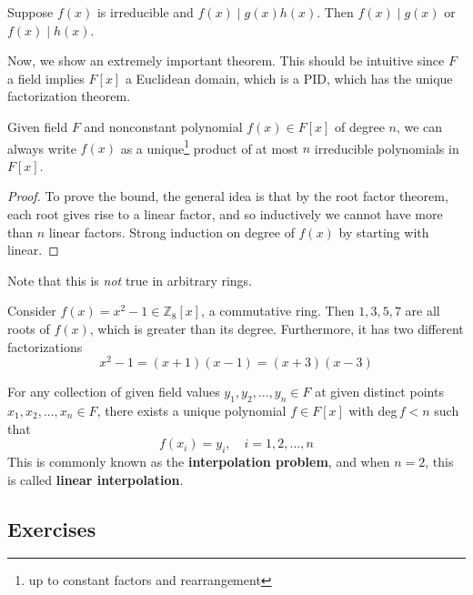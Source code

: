   \begin{lemma}
    Suppose $f(x)$ is irreducible and $f(x) \mid g(x) h(x)$. Then $f(x) \mid g(x)$ or $f(x) \mid h(x)$. 
  \end{lemma}

  Now, we show an extremely important theorem. This should be intuitive since $F$ a field implies $F[x]$ a Euclidean domain, which is a PID, which has the unique factorization theorem. 

  \begin{theorem}
    Given field $F$ and nonconstant polynomial $f(x) \in F[x]$ of degree $n$, we can always write $f(x)$ as a unique\footnote{up to constant factors and rearrangement} product of at most $n$ irreducible polynomials in $F[x]$. 
  \end{theorem}
  \begin{proof}
    To prove the bound, the general idea is that by the root factor theorem, each root gives rise to a linear factor, and so inductively we cannot have more than $n$ linear factors.  
    Strong induction on degree of $f(x)$ by starting with linear. 
  \end{proof}

  Note that this is \textit{not} true in arbitrary rings. 

  \begin{example}
    Consider $f(x) = x^2 - 1 \in \mathbb{Z}_8 [x]$, a commutative ring. Then $1, 3, 5, 7$ are all roots of $f(x)$, which is greater than its degree. Furthermore, it has two different factorizations 
    \begin{equation}
      x^2 - 1 = (x + 1)(x - 1) = (x + 3)(x - 3)
    \end{equation}
  \end{example} 

  \begin{theorem}[Interpolation]
    For any collection of given field values $y_1, y_2, ..., y_n \in F$ at given distinct points $x_1, x_2, ..., x_n \in F$, there exists a unique polynomial $f \in F[x]$ with deg$\, f < n$ such that
    \begin{equation}
      f(x_i) = y_i, \quad i = 1, 2, ..., n
    \end{equation}
    This is commonly known as the \textbf{interpolation problem}, and when $n = 2$, this is called \textbf{linear interpolation}. 
  \end{theorem} 

\subsection{Exercises}

